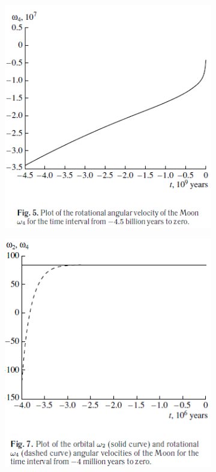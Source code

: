 \documentclass[fontsize = 11pt,a4paper]{article}
\begin{document}
\begin{figure}[h!]
  \begin{subfigure}[t]{0.4\linewidth}
    \includegraphics[width=\linewidth]{graph5.png}
  \end{subfigure}
  \begin{subfigure}[t]{0.4\linewidth}
    \includegraphics[width=\linewidth]{graph7.png}

\end{subfigure}
\end{figure}
\end{document}
